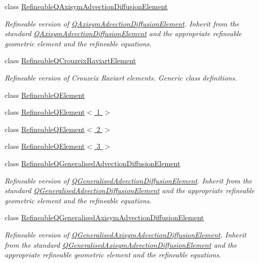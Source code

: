 \begin{DoxyCompactItemize}
class \hyperlink{classoomph_1_1RefineableQAxisymAdvectionDiffusionElement}{Refineable\+Q\+Axisym\+Advection\+Diffusion\+Element}
\begin{DoxyCompactList}\small\item\em Refineable version of \hyperlink{classoomph_1_1QAxisymAdvectionDiffusionElement}{Q\+Axisym\+Advection\+Diffusion\+Element}. Inherit from the standard \hyperlink{classoomph_1_1QAxisymAdvectionDiffusionElement}{Q\+Axisym\+Advection\+Diffusion\+Element} and the appropriate refineable geometric element and the refineable equations. \end{DoxyCompactList}\item 
class \hyperlink{classoomph_1_1RefineableQCrouzeixRaviartElement}{Refineable\+Q\+Crouzeix\+Raviart\+Element}
\begin{DoxyCompactList}\small\item\em Refineable version of Crouzeix Raviart elements. Generic class definitions. \end{DoxyCompactList}\item 
class \hyperlink{classoomph_1_1RefineableQElement}{Refineable\+Q\+Element}
\item 
class \hyperlink{classoomph_1_1RefineableQElement_3_011_01_4}{Refineable\+Q\+Element$<$ 1 $>$}
\item 
class \hyperlink{classoomph_1_1RefineableQElement_3_012_01_4}{Refineable\+Q\+Element$<$ 2 $>$}
\item 
class \hyperlink{classoomph_1_1RefineableQElement_3_013_01_4}{Refineable\+Q\+Element$<$ 3 $>$}
\item 
class \hyperlink{classoomph_1_1RefineableQGeneralisedAdvectionDiffusionElement}{Refineable\+Q\+Generalised\+Advection\+Diffusion\+Element}
\begin{DoxyCompactList}\small\item\em Refineable version of \hyperlink{classoomph_1_1QGeneralisedAdvectionDiffusionElement}{Q\+Generalised\+Advection\+Diffusion\+Element}. Inherit from the standard \hyperlink{classoomph_1_1QGeneralisedAdvectionDiffusionElement}{Q\+Generalised\+Advection\+Diffusion\+Element} and the appropriate refineable geometric element and the refineable equations. \end{DoxyCompactList}\item 
class \hyperlink{classoomph_1_1RefineableQGeneralisedAxisymAdvectionDiffusionElement}{Refineable\+Q\+Generalised\+Axisym\+Advection\+Diffusion\+Element}
\begin{DoxyCompactList}\small\item\em Refineable version of \hyperlink{classQGeneralisedAxisymAdvectionDiffusionElement}{Q\+Generalised\+Axisym\+Advection\+Diffusion\+Element}. Inherit from the standard \hyperlink{classQGeneralisedAxisymAdvectionDiffusionElement}{Q\+Generalised\+Axisym\+Advection\+Diffusion\+Element} and the appropriate refineable geometric element and the refineable equations. \end{DoxyCompactList}\item 

\end{DoxyCompactItemize}
